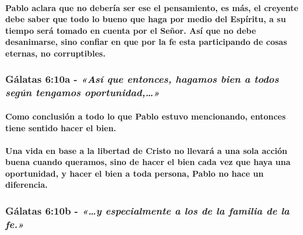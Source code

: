 \documentclass[11a pt,twoside]{article}
\newcommand{\scripture}[1]{%
  {\fontsize{12pt}{16pt}\selectfont\ScriptureFont\itshape #1}%
}
\let\oldsubsubsection\subsubsection
\renewcommand{\subsubsection}{\needspace{4\baselineskip}\oldsubsubsection}
\let\oldparagraph\paragraph
\renewcommand{\paragraph}{\needspace{3\baselineskip}\oldparagraph}
\begin{document}
\paragraph{Pablo aclara que no debería ser ese el pensamiento, es más,
el creyente debe saber que todo lo bueno que haga por medio del
Espíritu, a su tiempo será tomado en cuenta por el Señor. Así que no
debe desanimarse, sino confiar en que por la fe esta participando de
cosas eternas, no
corruptibles.}\label{pablo-aclara-que-no-deberuxeda-ser-ese-el-pensamiento-es-muxe1s-el-creyente-debe-saber-que-todo-lo-bueno-que-haga-por-medio-del-espuxedritu-a-su-tiempo-seruxe1-tomado-en-cuenta-por-el-seuxf1or.-asuxed-que-no-debe-desanimarse-sino-confiar-en-que-por-la-fe-esta-participando-de-cosas-eternas-no-corruptibles.}

\subsubsection{\texorpdfstring{Gálatas 6:10a -
\scripture{«Así que entonces, hagamos bien a todos según tengamos oportunidad,…»}}{Gálatas 6:10a - }}\label{guxe1latas-610a---asuxed-que-entonces-hagamos-bien-a-todos-seguxfan-tengamos-oportunidad}

\paragraph{Como conclusión a todo lo que Pablo estuvo mencionando,
entonces tiene sentido hacer el
bien.}\label{como-conclusiuxf3n-a-todo-lo-que-pablo-estuvo-mencionando-entonces-tiene-sentido-hacer-el-bien.}

\paragraph{Una vida en base a la libertad de Cristo no llevará a una
sola acción buena cuando queramos, sino de hacer el bien cada vez que
haya una oportunidad, y hacer el bien a toda persona, Pablo no hace un
diferencia.}\label{una-vida-en-base-a-la-libertad-de-cristo-no-llevaruxe1-a-una-sola-acciuxf3n-buena-cuando-queramos-sino-de-hacer-el-bien-cada-vez-que-haya-una-oportunidad-y-hacer-el-bien-a-toda-persona-pablo-no-hace-un-diferencia.}

\subsubsection{\texorpdfstring{Gálatas 6:10b -
\scripture{«…y especialmente a los de la familia de la fe.»}}{Gálatas 6:10b - }}\label{guxe1latas-610b---y-especialmente-a-los-de-la-familia-de-la-fe.}
\end{document}
